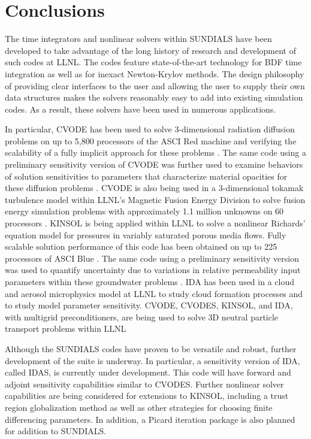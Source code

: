 \section{Conclusions}\label{s:conclusions}

The time integrators and nonlinear solvers within SUNDIALS have been
developed to take advantage of the long history of research and development
of such codes at LLNL.  The codes feature state-of-the-art 
technology for BDF time integration as well as for inexact Newton-Krylov
methods.  The design philosophy of providing clear interfaces to the 
user and allowing the user to supply their own data structures makes the 
solvers reasonably easy to add into existing simulation codes.  As a result,
these solvers have been used in numerous applications.

In particular, CVODE has been used to solve 3-dimensional radiation diffusion
problems on up to 5,800 processors of the ASCI Red machine and
verifying the scalability 
of a fully implicit approach for these problems \cite{BrWo:01}.
The same code using a preliminary sensitivity version of CVODE was 
further used to examine behaviors of solution sensitivities to 
parameters that characterize material opacities for these
diffusion problems \cite{LWG:03,LHB:00}.  CVODE is also being used in a 
3-dimensional tokamak turbulence model within LLNL's 
Magnetic Fusion Energy Division to solve fusion energy simulation problems
with approximately 1.1 million unknowns on 60 processors \cite{RXH:02}.
KINSOL is being applied within
LLNL to solve a nonlinear Richards' equation model for pressures in
variably saturated porous media flows.  
Fully scalable solution performance of this code has been obtained on
up to 225 processors of ASCI Blue \cite{JoWo:01,Woo:98}.  The same code using 
a preliminary sensitivity version was used to quantify
uncertainty due to variations in relative permeability input parameters
within these groundwater problems \cite{WGM:02}.
IDA has been used in a cloud and aerosol microphysics
model at LLNL to study cloud formation processes and to study model
parameter sensitivity.
CVODE, CVODES, KINSOL, and IDA, with multigrid preconditioners, 
are being used to
solve 3D neutral particle transport problems within LLNL

Although the SUNDIALS codes have proven to be 
versatile and robust, 
further development of the suite is underway.  
In particular, a sensitivity version of IDA, called IDAS, is 
currently under development.  This code will have forward and adjoint
sensitivity capabilities similar to CVODES.  Further nonlinear solver
capabilities are being considered for extensions to KINSOL, including 
a trust region globalization method as well as other strategies for
choosing finite differencing parameters.  In addition, a Picard iteration 
package is also planned for addition to SUNDIALS.  



